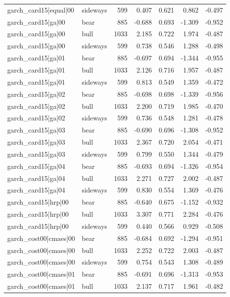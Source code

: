 \begin{table}
\begin{tabular}{llrrrrr}
garch\_card15|equal|00 & sideways & 599 & 0.407 & 0.621 & 0.862 & -0.497 \\
garch\_card15|ga|00 & bear & 885 & -0.688 & 0.693 & -1.309 & -0.952 \\
garch\_card15|ga|00 & bull & 1033 & 2.185 & 0.722 & 1.974 & -0.487 \\
garch\_card15|ga|00 & sideways & 599 & 0.738 & 0.546 & 1.288 & -0.498 \\
garch\_card15|ga|01 & bear & 885 & -0.697 & 0.694 & -1.344 & -0.955 \\
garch\_card15|ga|01 & bull & 1033 & 2.126 & 0.716 & 1.957 & -0.487 \\
garch\_card15|ga|01 & sideways & 599 & 0.813 & 0.549 & 1.359 & -0.472 \\
garch\_card15|ga|02 & bear & 885 & -0.698 & 0.698 & -1.339 & -0.956 \\
garch\_card15|ga|02 & bull & 1033 & 2.200 & 0.719 & 1.985 & -0.470 \\
garch\_card15|ga|02 & sideways & 599 & 0.736 & 0.548 & 1.281 & -0.478 \\
garch\_card15|ga|03 & bear & 885 & -0.690 & 0.696 & -1.308 & -0.952 \\
garch\_card15|ga|03 & bull & 1033 & 2.367 & 0.720 & 2.054 & -0.471 \\
garch\_card15|ga|03 & sideways & 599 & 0.799 & 0.550 & 1.344 & -0.479 \\
garch\_card15|ga|04 & bear & 885 & -0.693 & 0.694 & -1.326 & -0.954 \\
garch\_card15|ga|04 & bull & 1033 & 2.271 & 0.727 & 2.002 & -0.487 \\
garch\_card15|ga|04 & sideways & 599 & 0.830 & 0.554 & 1.369 & -0.476 \\
garch\_card15|hrp|00 & bear & 885 & -0.640 & 0.675 & -1.152 & -0.932 \\
garch\_card15|hrp|00 & bull & 1033 & 3.307 & 0.771 & 2.284 & -0.476 \\
garch\_card15|hrp|00 & sideways & 599 & 0.440 & 0.566 & 0.929 & -0.508 \\
garch\_cost00|cmaes|00 & bear & 885 & -0.684 & 0.692 & -1.294 & -0.951 \\
garch\_cost00|cmaes|00 & bull & 1033 & 2.252 & 0.722 & 2.003 & -0.487 \\
garch\_cost00|cmaes|00 & sideways & 599 & 0.754 & 0.543 & 1.308 & -0.489 \\
garch\_cost00|cmaes|01 & bear & 885 & -0.691 & 0.696 & -1.313 & -0.953 \\
garch\_cost00|cmaes|01 & bull & 1033 & 2.137 & 0.717 & 1.961 & -0.482 \\

\end{tabular}
\end{table}
